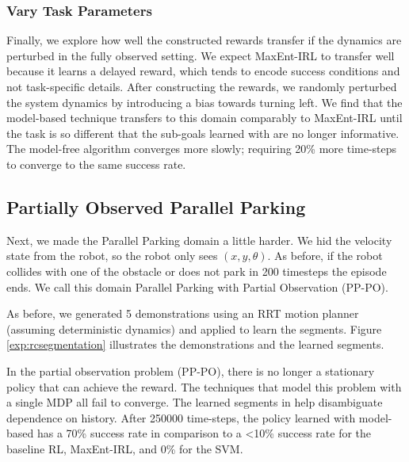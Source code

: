 \subsubsection{Vary Task Parameters}
Finally, we explore how well the constructed rewards transfer if the dynamics are perturbed in the fully observed setting.
We expect MaxEnt-IRL to transfer well because it learns a delayed reward, which tends to encode success conditions and not task-specific details.
After constructing the rewards, we randomly perturbed the system dynamics by introducing a bias towards turning left.
We find that the model-based \hirl technique transfers to this domain comparably to MaxEnt-IRL until the task is so different that the sub-goals learned with \hirl are no longer informative.
The model-free \hirl algorithm converges more slowly; requiring 20\% more time-steps to converge to the same success rate. 



\subsection{Partially Observed Parallel Parking}
Next, we made the  Parallel Parking domain a little harder. We hid the velocity state from the robot, so the robot only sees $(x,y,\theta)$. As before, if the robot collides with one of the obstacle or does not park in 200 timesteps the episode ends.
We call this domain Parallel Parking with Partial Observation (PP-PO).

As before, we generated 5 demonstrations using an RRT motion planner (assuming deterministic dynamics) and applied \hirl to learn the segments.
Figure \ref{exp:rcsegmentation} illustrates the demonstrations and the learned segments. 


In the partial observation problem (PP-PO), there is no longer a stationary policy that can achieve the reward.
The techniques that model this problem with a single MDP all fail to converge.
The learned segments in \hirl help disambiguate dependence on history.
After 250000 time-steps, the policy learned with model-based \hirl has a 70\% success rate in comparison to a <10\% success rate for the baseline RL, MaxEnt-IRL, and 0\% for the SVM.









